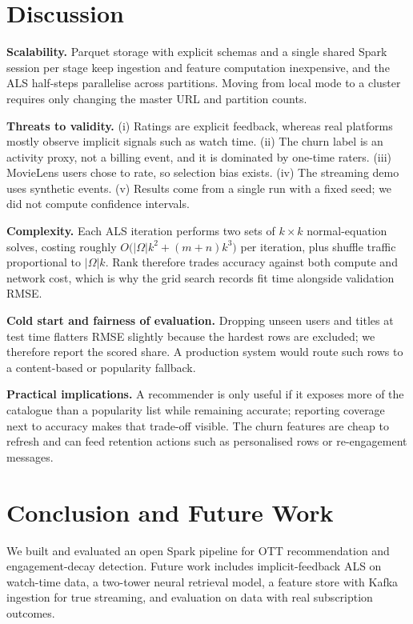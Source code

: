\documentclass[conference]{IEEEtran}
\begin{document}
\section{Discussion}
\textbf{Scalability.} Parquet storage with explicit schemas and a single shared Spark session per stage keep ingestion and feature computation inexpensive, and the ALS half-steps parallelise across partitions. Moving from local mode to a cluster requires only changing the master URL and partition counts.

\textbf{Threats to validity.} (i) Ratings are explicit feedback, whereas real platforms mostly observe implicit signals such as watch time. (ii) The churn label is an activity proxy, not a billing event, and it is dominated by one-time raters. (iii) MovieLens users chose to rate, so selection bias exists. (iv) The streaming demo uses synthetic events. (v) Results come from a single run with a fixed seed; we did not compute confidence intervals.

\textbf{Complexity.} Each ALS iteration performs two sets of $k\times k$ normal-equation solves, costing roughly $O\big(|\Omega|k^{2}+(m+n)k^{3}\big)$ per iteration, plus shuffle traffic proportional to $|\Omega|k$. Rank therefore trades accuracy against both compute and network cost, which is why the grid search records fit time alongside validation RMSE.

\textbf{Cold start and fairness of evaluation.} Dropping unseen users and titles at test time flatters RMSE slightly because the hardest rows are excluded; we therefore report the scored share. A production system would route such rows to a content-based or popularity fallback.

\textbf{Practical implications.} A recommender is only useful if it exposes more of the catalogue than a popularity list while remaining accurate; reporting coverage next to accuracy makes that trade-off visible. The churn features are cheap to refresh and can feed retention actions such as personalised rows or re-engagement messages.

\section{Conclusion and Future Work}
We built and evaluated an open Spark pipeline for OTT recommendation and engagement-decay detection. Future work includes implicit-feedback ALS on watch-time data, a two-tower neural retrieval model, a feature store with Kafka ingestion for true streaming, and evaluation on data with real subscription outcomes.
\end{document}
